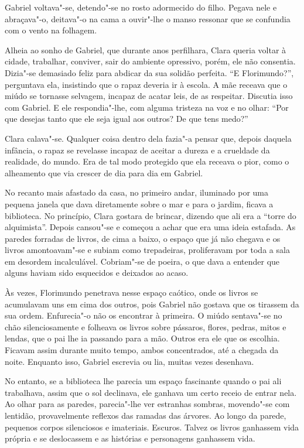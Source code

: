 Gabriel voltava"-se, detendo"-se no rosto adormecido do filho. Pegava nele
e abraçava"-o, deitava"-o na cama a ouvir"-lhe o manso ressonar que se
confundia com o vento na folhagem.

Alheia ao sonho de Gabriel, que durante anos perfilhara, Clara queria
voltar à cidade, trabalhar, conviver, sair do ambiente opressivo, porém,
ele não consentia. Dizia"-se demasiado feliz para abdicar da sua
solidão perfeita. ``E Florimundo?'', perguntava ela, insistindo que o
rapaz deveria ir à escola. A mãe receava que o miúdo se tornasse
selvagem, incapaz de acatar leis, de as respeitar. Discutia isso com
Gabriel. E ele respondia"-lhe, com alguma tristeza na voz e no olhar:
``Por que desejas tanto que ele seja igual aos outros? De que tens medo?''

Clara calava"-se. Qualquer coisa dentro dela fazia"-a pensar que, depois
daquela infância, o rapaz se revelasse incapaz de aceitar a dureza e a
crueldade da realidade, do mundo. Era de tal modo protegido que ela
receava o pior, como o alheamento que via crescer de dia para dia em
Gabriel.

No recanto mais afastado da casa, no primeiro andar, iluminado por uma
pequena janela que dava diretamente sobre o mar e para o jardim, ficava
a biblioteca. No princípio, Clara gostara de brincar, dizendo que ali
era a ``torre do alquimista''. Depois cansou"-se e começou a achar que
era uma ideia estafada. As paredes forradas de livros, de cima a baixo,
o espaço que já não chegava e os livros amontoavam"-se e subiam como
trepadeiras, proliferavam por toda a sala em desordem incalculável.
Cobriam"-se de poeira, o que dava a entender que alguns haviam sido
esquecidos e deixados ao acaso.

Às vezes, Florimundo penetrava nesse espaço caótico, onde os livros se
acumulavam uns em cima dos outros, pois Gabriel não gostava que os
tirassem da sua ordem. Enfurecia"-o não os encontrar à primeira. O miúdo
sentava"-se no chão silenciosamente e folheava os livros sobre pássaros,
flores, pedras, mitos e lendas, que o pai lhe ia passando para a mão.
Outros era ele que os escolhia. Ficavam assim durante muito tempo, ambos
concentrados, até a chegada da noite. Enquanto isso, Gabriel escrevia ou
lia, muitas vezes desenhava.

No entanto, se a biblioteca lhe parecia um espaço fascinante quando o
pai ali trabalhava, assim que o sol declinava, ele ganhava um certo
receio de entrar nela. Ao olhar para as paredes, parecia"-lhe ver
estranhas sombras, movendo"-se com lentidão, provavelmente reflexos das
ramadas das árvores. Ao longo da parede, pequenos corpos silenciosos e
imateriais. Escuros. Talvez os livros ganhassem vida própria e se
deslocassem e as histórias e personagens ganhassem vida.

